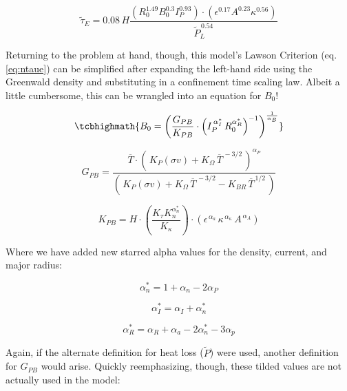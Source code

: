 \begin{equation}
	\tilde \tau_E = 0.08 \, H \frac{  
		\left( R_0^{1.49} B_0 ^ {0.3} I_P^{0.93} \right) \cdot \left( \epsilon ^ {0.17} A^{0.23}  \kappa ^ {0.56} \right) }{ \tilde P_L ^ {\, 0.54} }	
\end{equation}

Returning to the problem at hand, though, this model's Lawson Criterion (eq. \ref{eq:ntaue}) can be simplified after expanding the left-hand side using the Greenwald density and substituting in a confinement time scaling law. Albeit a little cumbersome, this can be wrangled into an equation for $B_0$!

\begin{equation}
	\label{eq:b_0_power}
	\tcbhighmath{
	B_0 = \left( \frac{ G_{PB} }{ K_{PB} } \cdot \left( I_P^{\,\alpha_I^*} \, R_0^{ \alpha_R^* } \right)^{-1} \right) ^ { \frac{1}{ \alpha_B } }
	}
\end{equation}

\begin{equation}
	G_{PB} = \frac{ \overline{T} \cdot \left( \, K_P (\sigma v) + K_\Omega  \, \overline{T}^{  \,-3/2 } \, \right) ^ { \alpha_P } }{ \left( \, K_P (\sigma v) + K_\Omega  \, \overline{T}^{  \,-3/2 } - K_{BR} \, \overline{T}^{  \,1/2 } \, \right) }
\end{equation}

\begin{equation}
	K_{PB} = H \cdot \left( \frac{ K_\tau K_n^{\alpha_n^*}}{K_\kappa } \right) \cdot \left( 
     \epsilon^{\,\alpha_a} \, \kappa^{\,\alpha_\kappa} \, A^{\,\alpha_A}\right)
\end{equation}

Where we have added new starred alpha values for the density, current, and major radius:

\begin{equation}
  \alpha_n^* = 1 + \alpha_n - 2 \alpha_P
\end{equation}

\begin{equation}
  \alpha_I^* = \alpha_I + \alpha_n^*
\end{equation}

\begin{equation}
  \alpha_R^* = \alpha_R + \alpha_a - 2  \alpha_n^* - 3 \alpha_p
\end{equation}

Again, if the alternate definition for heat loss ($\tilde P$) were used, another definition for $G_{PB}$ would arise. Quickly reemphasizing, though, these tilded values are not actually used in the model:

